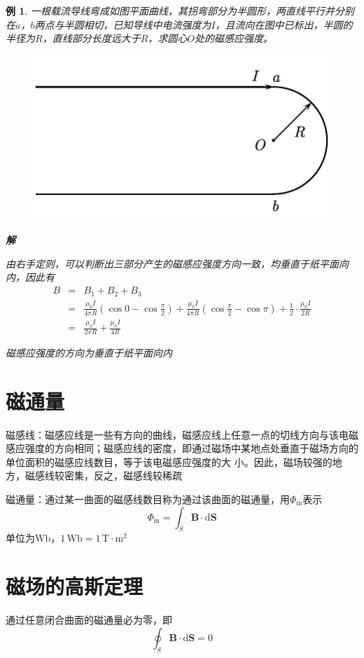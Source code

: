 \documentclass[12pt, a4paper, twoside]{ctexbook}
\newtheorem{example}[theorem]{例}
\begin{document}
\begin{example}
    一根载流导线弯成如图平面曲线，其拐弯部分为半圆形，两直线平行并分别在$a$，$b$两点与半圆相切，已知导线中电流强度为$I$，且流向在图中已标出，半圆的半径为$R$，直线部分长度远大于$R$，求圆心$O$处的磁感应强度。
    \begin{figure}[H]
        \centerline{\includegraphics[scale=0.88]{CH10EX01.pdf}}
    \end{figure}

    \noindent\textbf{解}

    由右手定则，可以判断出三部分产生的磁感应强度方向一致，均垂直于纸平面向内，因此有
    \begin{eqnarray}
        B &=&B_1+B_2+B_3 \nonumber \\
        ~&=& \frac{\mu_0I}{4\pi R}\left(\cos0-\cos\frac{\pi}{2}\right)+\frac{\mu_0I}{4\pi R}\left(\cos\frac{\pi}{2}-\cos\pi\right)+\frac{1}{2}\cdot\frac{\mu_0I}{2R} \nonumber \\
        ~&=&\frac{\mu_0I}{2\pi R}+\frac{\mu_0I}{4R} \nonumber
    \end{eqnarray}

    磁感应强度的方向为垂直于纸平面向内
\end{example}
\section{磁通量}
{\sonti 磁感线}：磁感应线是一些有方向的曲线，磁感应线上任意一点的切线方向与该电磁感应强度的方向相同；磁感应线的密度，即通过磁场中某地点处垂直于磁场方向的单位面积的磁感应线数目，等于该电磁感应强度的大
小。因此，磁场较强的地方，磁感线较密集，反之，磁感线较稀疏

{\sonti 磁通量}：通过某一曲面的磁感线数目称为通过该曲面的磁通量，用$\varPhi_\mathrm{m}$表示
$$
\varPhi_\mathrm{m}=\int_S \boldsymbol{B}\cdot\mathrm{d}\boldsymbol{S}
$$
单位为$\mathrm{Wb}$，$1\,\mathrm{Wb}=1\,\mathrm{T}\cdot\mathrm{m}^2$
\section{磁场的高斯定理}
通过任意闭合曲面的磁通量必为零，即
$$
\oint_S\boldsymbol{B}\cdot\mathrm{d}\boldsymbol{S}=0
$$
\end{document}
